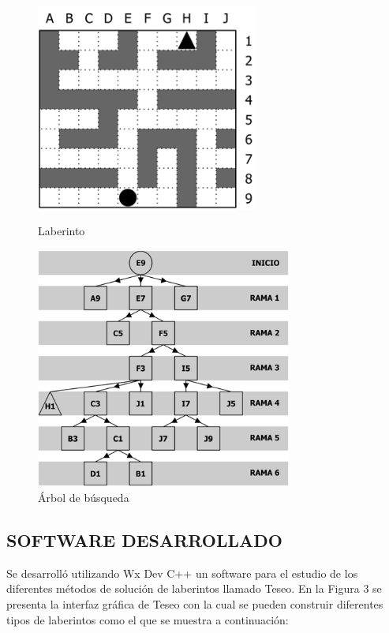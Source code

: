 \documentclass{article}%
\begin{document}
\begin{figure}[h]
  \begin{minipage}[b]{0.5\linewidth}
	\includegraphics[width=0.65\textwidth]{laberinto.png}
     \caption{Laberinto}
  \end{minipage}%
  \begin{minipage}[b]{0.5\linewidth}
	\includegraphics[width=0.75\textwidth]{busqueda.png}
     \caption{\'Arbol de b\'usqueda}
  \end{minipage}
\end{figure}

\subsection*{SOFTWARE DESARROLLADO}
Se desarroll\'o utilizando Wx Dev C++ un software para el estudio de los diferentes m\'etodos de soluci\'on de laberintos llamado Teseo. En la Figura 3 se presenta la interfaz gr\'afica de Teseo con la cual se pueden construir diferentes tipos de laberintos como el que se muestra a continuaci\'on:
\end{document}
